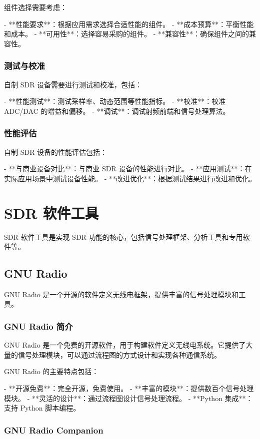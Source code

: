 \documentclass[UTF8]{ctexbook}
\begin{document}
组件选择需要考虑：

- **性能要求**：根据应用需求选择合适性能的组件。
- **成本预算**：平衡性能和成本。
- **可用性**：选择容易采购的组件。
- **兼容性**：确保组件之间的兼容性。

\subsection{测试与校准}

自制 SDR 设备需要进行测试和校准，包括：

- **性能测试**：测试采样率、动态范围等性能指标。
- **校准**：校准 ADC/DAC 的增益和偏移。
- **调试**：调试射频前端和信号处理算法。

\subsection{性能评估}

自制 SDR 设备的性能评估包括：

- **与商业设备对比**：与商业 SDR 设备的性能进行对比。
- **应用测试**：在实际应用场景中测试设备性能。
- **改进优化**：根据测试结果进行改进和优化。

\chapter{SDR 软件工具}

SDR 软件工具是实现 SDR 功能的核心，包括信号处理框架、分析工具和专用软件等。

\section{GNU Radio}

GNU Radio 是一个开源的软件定义无线电框架，提供丰富的信号处理模块和工具。

\subsection{GNU Radio 简介}

GNU Radio 是一个免费的开源软件，用于构建软件定义无线电系统。它提供了大量的信号处理模块，可以通过流程图的方式设计和实现各种通信系统。

GNU Radio 的主要特点包括：

- **开源免费**：完全开源，免费使用。
- **丰富的模块**：提供数百个信号处理模块。
- **灵活的设计**：通过流程图设计信号处理流程。
- **Python 集成**：支持 Python 脚本编程。

\subsection{GNU Radio Companion}
\end{document}

